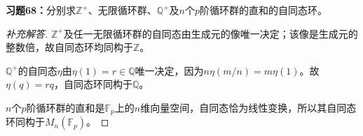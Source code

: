 \begin{problem}
\textbf{习题68：}分别求$\mathbb Z^+$、无限循环群、$\mathbb Q^+$及$n$个$p$阶循环群的直和的自同态环。
\end{problem}
\begin{proof}[补充解答]
$\mathbb Z^+$及任一无限循环群的自同态由生成元的像唯一决定；该像是生成元的整数倍，故自同态环均同构于$\mathbb Z$。

$\mathbb Q^+$的自同态$\eta$由$\eta(1)=r\in\mathbb Q$唯一决定，因为$n\eta(m/n)=m\eta(1)$。故$\eta(q)=rq$，自同态环同构于$\mathbb Q$。

$n$个$p$阶循环群的直和是$\mathbb F_p$上的$n$维向量空间，自同态恰为线性变换，所以其自同态环同构于$M_n(\mathbb F_p)$。
\end{proof}

